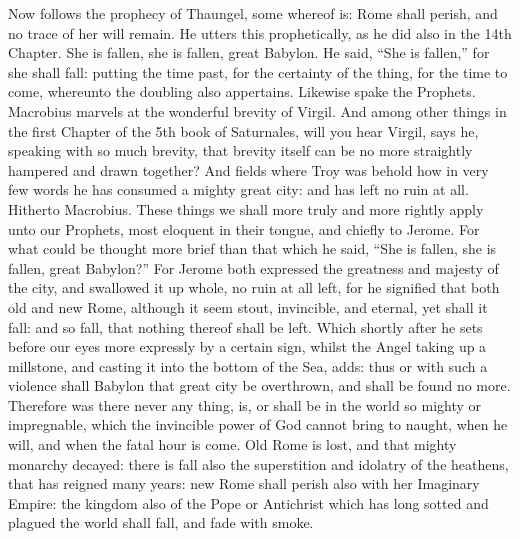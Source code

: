 Now follows the prophecy of Thaungel, some whereof is: Rome shall perish, and no trace of her will remain. He utters this prophetically, as he did also in the 14th Chapter. She is fallen, she is fallen, great Babylon. He said, “She is fallen,” for she shall fall: putting the time past, for the certainty of the thing, for the time to come, whereunto the doubling also appertains. Likewise spake the Prophets. Macrobius marvels at the wonderful brevity of Virgil. And among other things in the first Chapter of the 5th book of Saturnales, will you hear Virgil, says he, speaking with so much brevity, that brevity itself can be no more straightly hampered and drawn together? And fields where Troy was behold how in very few words he has consumed a mighty great city: and has left no ruin at all. Hitherto Macrobius. These things we shall more truly and more rightly apply unto our Prophets, most eloquent in their tongue, and chiefly to Jerome. For what could be thought more brief than that which he said, “She is fallen, she is fallen, great Babylon?” For Jerome both expressed the greatness and majesty of the city, and swallowed it up whole, no ruin at all left, for he signified that both old and new Rome, although it seem stout, invincible, and eternal, yet shall it fall: and so fall, that nothing thereof shall be left. Which shortly after he sets before our eyes more expressly by a certain sign, whilst the Angel taking up a millstone, and casting it into the bottom of the Sea, adds: thus or with such a violence shall Babylon that great city be overthrown, and shall be found no more. Therefore was there never any thing, is, or shall be in the world so mighty or impregnable, which the invincible power of God cannot bring to naught, when he will, and when the fatal hour is come. Old Rome is lost, and that mighty monarchy decayed: there is fall also the superstition and idolatry of the heathens, that has reigned many years: new Rome shall perish also with her Imaginary Empire: the kingdom also of the Pope or Antichrist which has long sotted and plagued the world shall fall, and fade with smoke.

